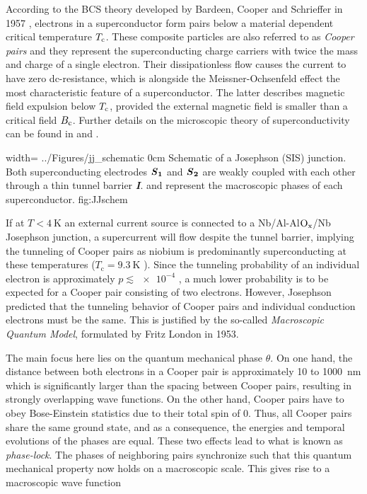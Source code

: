 According to the BCS theory developed by Bardeen, Cooper and Schrieffer in 1957 \cite{Bardeen1957}, electrons in a superconductor form pairs below a material dependent critical temperature $T_{\rm c}$. These composite particles are also referred to as \textit{Cooper pairs} and they represent the superconducting charge carriers with twice the mass and charge of a single electron. Their dissipationless flow causes the current to have zero dc-resistance, which is alongside the Meissner-Ochsenfeld effect \cite{Meissner1933} the most characteristic feature of a superconductor. The latter describes magnetic field expulsion below $T_{\rm c}$, provided the external magnetic field is smaller than a critical field $B_{\rm c}$. Further details on the microscopic theory of superconductivity can be found in \cite{Bardeen1957} and \cite{Ginzburg1950}.

{width=\textwidth}
{../Figures/jj_schematic}
{0cm}
{Schematic of a Josephson (SIS) junction. Both superconducting electrodes $\textbf{\textit{S}}_\textbf{1}$ and $\textbf{\textit{S}}_\textbf{2}$ are weakly coupled with each other through a thin tunnel barrier \textbf{\textit{I}}.  and  represent the macroscopic phases of each superconductor.} 
{fig:JJschem}

If at $T < \qty{4}{\kelvin}$ an external current source is connected to a Nb/Al-Al$\rm O_x$/Nb Josephson junction, a supercurrent will flow despite the tunnel barrier, implying the tunneling of Cooper pairs as niobium is predominantly superconducting at these temperatures ($T_\mathrm{c} = \qty{9.3}{\kelvin}$ \cite{Inaba_1980}). Since the tunneling probability of an individual electron is approximately $p \lesssim \num{e-4}$ \cite{Gross2016}, a much lower probability is to be expected for a Cooper pair consisting of two electrons. However, Josephson predicted that the tunneling behavior of Cooper pairs and individual conduction electrons must be the same. This is justified by the so-called \textit{Macroscopic Quantum Model}, formulated by Fritz London in 1953.

The main focus here lies on the quantum mechanical phase $\theta$. On one hand, the distance between both electrons in a Cooper pair is approximately 10 to \qty{1000}{\nm} which is significantly larger than the spacing between Cooper pairs, resulting in strongly overlapping wave functions. On the other hand, Cooper pairs have to obey Bose-Einstein statistics due to their total spin of 0. Thus, all Cooper pairs share the same ground state, and as a consequence, the energies and temporal evolutions of the phases are equal. These two effects lead to what is known as \textit{phase-lock}. The phases of neighboring pairs synchronize such that this quantum mechanical property now holds on a macroscopic scale. This gives rise to a macroscopic wave function

